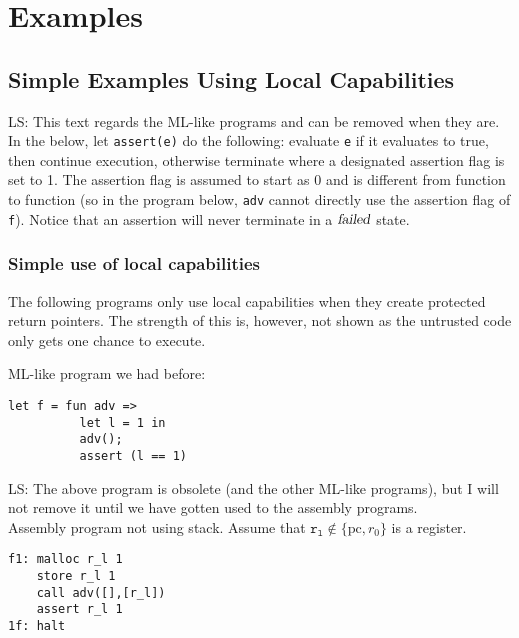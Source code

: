 \documentclass[a4paper]{article}
\newcommand\lau[1]{{\color{purple} \sf \footnotesize {LS: #1}}\\}
\newcommand{\pcreg}{\mathrm{pc}}
\newcommand{\failed}{\textsl{failed}}
\begin{document}
\section{Examples}
\label{sec:examples}
\subsection{Simple Examples Using Local Capabilities}
\label{subsec:example-loc-cap}
\lau{This text regards the ML-like programs and can be removed when they are.}
In the below, let \texttt{assert(e)} do the following: evaluate \texttt{e} if it evaluates to true, then continue execution, otherwise terminate where a designated assertion flag is set to 1. The assertion flag is assumed to start as 0 and is different from function to function (so in the program below, \texttt{adv} cannot directly use the assertion flag of \texttt{f}). Notice that an assertion will never terminate in a $\failed$ state.
\subsubsection{Simple use of local capabilities}
The following programs only use local capabilities when they create protected return pointers. The strength of this is, however, not shown as the untrusted code only gets one chance to execute.

ML-like program we had before:
\begin{verbatim}
let f = fun adv =>
          let l = 1 in
          adv();
          assert (l == 1)
\end{verbatim}
\lau{The above program is obsolete (and the other ML-like programs), but I will not remove it until we have gotten used to the assembly programs.}

Assembly program not using stack. Assume that $\mathtt{r_l} \not\in \{\pcreg,r_0 \}$ is a register.
\begin{verbatim}
f1: malloc r_l 1
    store r_l 1
    call adv([],[r_l])
    assert r_l 1
1f: halt
\end{verbatim}
\end{document}
